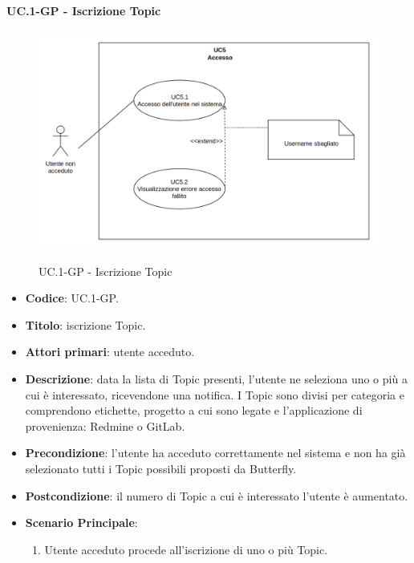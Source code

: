 	\paragraph{UC\theuccount.1-GP - Iscrizione Topic}
		\begin{figure}[H]
			\centering
			\includegraphics[width=\columnwidth]{img/UC5.png}\\
			\caption{UC\theuccount.1-GP - Iscrizione Topic}
		\end{figure}
		\begin{itemize}
			\item \textbf{Codice}: UC\theuccount.1-GP.
			\item \textbf{Titolo}: iscrizione Topic.
			\item \textbf{Attori primari}: utente acceduto.
			\item \textbf{Descrizione}: data la lista di Topic presenti, l’utente ne seleziona uno o
			più a cui è interessato, ricevendone una notifica. I Topic sono divisi per categoria e
			comprendono etichette, progetto a cui sono legate e l'applicazione di provenienza: Redmine o GitLab.
			\item \textbf{Precondizione}: l’utente ha acceduto correttamente nel sistema e non ha già
			selezionato tutti i Topic possibili proposti da Butterfly.
			\item \textbf{Postcondizione}: il numero di Topic a cui è interessato l’utente è aumentato.
			\item \textbf{Scenario Principale}:
			\begin{enumerate}
				\item Utente acceduto procede all'iscrizione di uno o più Topic.
			\end{enumerate}
		\end{itemize}
	
